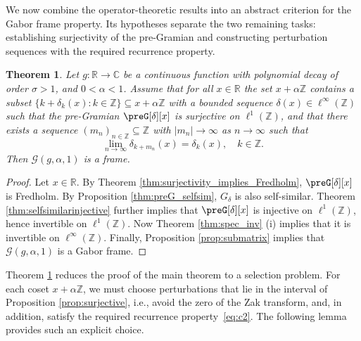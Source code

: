 \documentclass[reqno,a4paper,12pt]{amsart}
\numberwithin{equation}{section}
\newtheorem{theorem}[definition]{Theorem}
\def\Z{{\mathbb Z}}
\def\R{{\mathbb R}}
\def\C{{\mathbb C}}
\newcommand\1{\mathds{1}}
\newcommand{\cG}{\mathcal{G}}
\begin{document}
We now combine the operator-theoretic results into an abstract criterion for the Gabor frame property. Its hypotheses separate the two remaining tasks:
establishing surjectivity of the pre-Gramian and constructing perturbation sequences with the required recurrence property.

\begin{theorem}\label{thm:semimain}
    Let $g:\R\to\C$ be a continuous function with polynomial decay of order $\sigma>1$, and $0<\alpha<1$.
    Assume that for all 
    $x\in\R$ the set $x+\alpha\Z$ contains a subset
    $\{k+\delta_k(x):k\in\Z\}\subseteq x+\alpha\Z$  with a bounded
    sequence $\delta (x) \in \ell ^\infty (\Z )$ such that the pre-Gramian $\preG[\delta][x]$ is surjective on $\ell^1(\Z)$, and that there exists a sequence $(m_n)_{n\in\Z} \subseteq \Z$ with $|m_n|\to\infty$ as $n\to\infty$ such that 
    \begin{equation}\label{eq:thm:semimain_inj}
        \lim\limits_{n\to\infty} \delta_{k+m_n}(x) = \delta_k(x),\quad k\in\Z.
    \end{equation}
    Then $\cG (g,\alpha,1)$ is a frame.
\end{theorem}
\begin{proof}
Let $x\in\R$.
By Theorem \ref{thm:surjectivity_implies_Fredholm}, $\preG[\delta][x]$ is Fredholm.
By Proposition \ref{thm:preG_selfsim}, $G_\delta $  is also self-similar. 
Theorem \ref{thm:selfsimilarinjective} further implies that $\preG[\delta][x]$ is  injective on $\ell^1(\Z)$, hence invertible on $\ell^1(\Z)$. 
Now Theorem \ref{thm:spec_inv} \textup{(i)} implies that it is invertible on $\ell^\infty(\Z)$. 
Finally, Proposition \ref{prop:submatrix} implies that $\cG(g,\alpha,1)$ is a Gabor frame.
\end{proof}

Theorem \ref{thm:semimain} reduces the proof of the main theorem to a
selection problem. For each coset $x+\alpha\mathbb Z$, we must choose
perturbations that lie in the interval of Proposition
\ref{prop:surjective}, i.e., avoid the zero of the Zak transform,
and, in addition,  satisfy the required recurrence
property~\eqref{eq:c2}.  The following lemma provides such an explicit
choice. 
\end{document}
